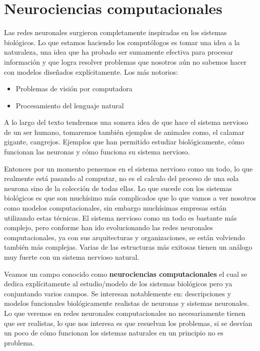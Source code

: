 \section{Neurociencias computacionales}

Las redes neuronales surgieron completamente inspiradas en los sistemas biológicos. 
Lo que estamos haciendo los computólogos es tomar una idea a la naturaleza, una idea que ha probado ser sumamente efectiva para procesar información y que logra resolver problemas que nosotros aún no sabemos hacer con modelos diseñados explícitamente.
Los más notorios: 
\begin{itemize}
\item Problemas de visión por computadora 
\item Procesamiento del lenguaje natural 
\end{itemize}

A lo largo del texto tendremos una somera idea de que hace el sistema nervioso de un ser humano, tomaremos también ejemplos de animales como, el calamar gigante, cangrejos. Ejemplos que han permitido estudiar biológicamente, cómo funcionan las neuronas y cómo funciona su sistema nervioso. 

Entonces por un momento pensemos en el sistema nervioso como un todo, lo que realmente está pasando al computar, no es el calculo del proceso  de una sola neurona sino de la colección de todas ellas. Lo que sucede con los sistemas biológicos es que son muchísimo más complicados que lo que vamos a ver nosotros como modelos computacionales, sin embargo muchísimas empresas están utilizando estas técnicas. 
El sistema nervioso como un todo es bastante más complejo, pero conforme han ido evolucionando las redes neuronales computacionales, ya con sus arquitecturas y organizaciones, se están volviendo también más complejas. Varias de las estructuras más exitosas tienen un análogo muy fuerte con un sistema nervioso natural. 

Veamos un campo conocido como \textbf{neurociencias computacionales} el cual se dedica explícitamente al estudio/modelo de los sistemas biológicos pero ya conjuntando varios campos. Se interesan notablemente en:  descripciones y modelos funcionales biológicamente realistas de neuronas y sistemas neuronales. Lo que veremos en redes neuronales computacionales no necesariamente tienen que ser realistas, lo que nos interesa es que resuelvan los problemas, si se desvían un poco de cómo funcionan los sistemas naturales en un principio no es problema. 

